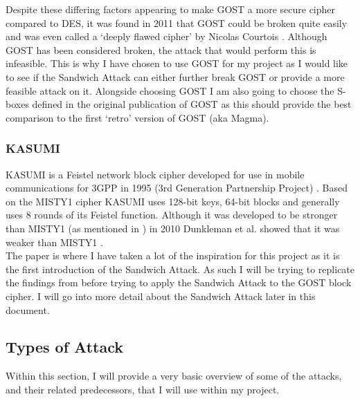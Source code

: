 \documentclass{article}
\begin{document}
Despite these differing factors appearing to make GOST a more secure cipher compared to DES, it was found in 2011 that GOST could be broken quite easily and was even called a ‘deeply flawed cipher’ by Nicolas Courtois \cite{cryptoeprint:2011/211}. 
Although GOST has been considered broken, the attack that would perform this is infeasible. This is why I have chosen to use GOST for my project as I would like to see if the Sandwich Attack can either further break GOST or provide a more feasible attack on it. Alongside choosing GOST I am also going to choose the S-boxes defined in the original publication of GOST \cite{rfc8891} as this should provide the best comparison to the first ‘retro’ version of GOST (aka Magma).
\subsubsection{KASUMI}
KASUMI is a Feistel network block cipher developed for use in mobile communications for 3GPP in 1995 (3rd Generation Partnership Project) \cite{wiki:KASUMI}. Based on the MISTY1 cipher \cite{wiki:MISTY1} KASUMI uses 128-bit keys, 64-bit blocks and generally uses 8 rounds of its Feistel function. Although it was developed to be stronger than MISTY1 (as mentioned in \cite{cryptoeprint:2004/094}) in 2010 Dunkleman et al. showed that it was weaker than MISTY1 \cite{C:DunKelSha10}. \\ 
The paper \cite{C:DunKelSha10} is where I have taken a lot of the inspiration for this project as it is the first introduction of the Sandwich Attack. As such I will be trying to replicate the findings from \cite{C:DunKelSha10} before trying to apply the Sandwich Attack to the GOST block cipher. I will go into more detail about the Sandwich Attack later in this document.
\subsection{Types of Attack}
Within this section, I will provide a very basic overview of some of the attacks, and their related predecessors, that I will use within my project. 
\end{document}
